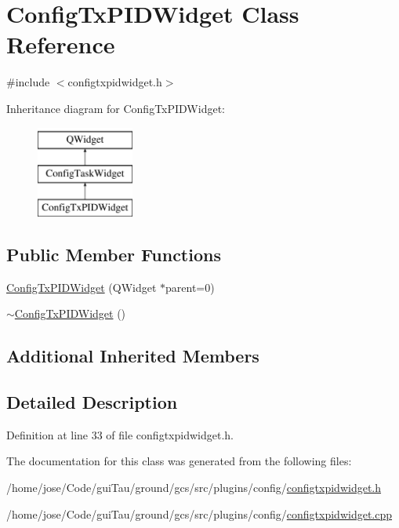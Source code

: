 \hypertarget{class_config_tx_p_i_d_widget}{\section{Config\-Tx\-P\-I\-D\-Widget Class Reference}
\label{class_config_tx_p_i_d_widget}
}


{\ttfamily \#include $<$configtxpidwidget.\-h$>$}

Inheritance diagram for Config\-Tx\-P\-I\-D\-Widget\-:\begin{figure}[H]
\begin{center}
\leavevmode
\includegraphics[height=3.000000cm]{class_config_tx_p_i_d_widget}
\end{center}
\end{figure}
\subsection*{Public Member Functions}
\begin{DoxyCompactItemize}
\item 
\hyperlink{group___config_plugin_ga2ecc01b090b6955e7204c19432ad8628}{Config\-Tx\-P\-I\-D\-Widget} (Q\-Widget $\ast$parent=0)
\item 
\hyperlink{group___config_plugin_ga2c39980676875ea742391215e79d5262}{$\sim$\-Config\-Tx\-P\-I\-D\-Widget} ()
\end{DoxyCompactItemize}
\subsection*{Additional Inherited Members}


\subsection{Detailed Description}


Definition at line 33 of file configtxpidwidget.\-h.



The documentation for this class was generated from the following files\-:\begin{DoxyCompactItemize}
\item 
/home/jose/\-Code/gui\-Tau/ground/gcs/src/plugins/config/\hyperlink{configtxpidwidget_8h}{configtxpidwidget.\-h}\item 
/home/jose/\-Code/gui\-Tau/ground/gcs/src/plugins/config/\hyperlink{configtxpidwidget_8cpp}{configtxpidwidget.\-cpp}\end{DoxyCompactItemize}
